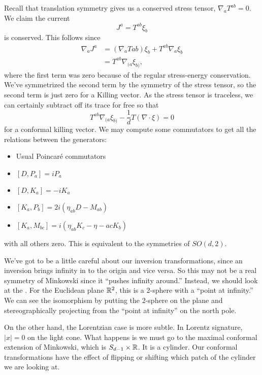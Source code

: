 Recall that translation symmetry gives us a conserved stress tensor, $\nabla_a T^{ab}=0$. We claim the current
\begin{equation}
    J^a = T^{ab} \xi_b
\end{equation}
is conserved. This follows since
\begin{align}
    \nabla_a J^a &= (\nabla_a T{ab})\xi_b + T^{ab} \nabla_a \xi_b\\
        &=T^{ab} \nabla_{(a}\xi_{b)},
\end{align}
where the first term was zero because of the regular stress-energy conservation. We've symmetrized the second term by the symmetry of the stress tensor, so the second term is just zero for a Killing vector. As the stress tensor is traceless, we can certainly subtract off its trace for free so that
\begin{equation}
    T^{ab}\nabla_{(a}\xi_{b)} - \frac{1}{d} T(\nabla \cdot \xi) = 0
\end{equation}
for a conformal killing vector. We may compute some commutators to get all the relations between the generators:
\begin{itemize}
    \item Usual Poincar\'e commutators
    \item $[D,P_a]=iP_a$
    \item $[D,K_a] = -iK_a$
    \item $[K_a,P_b] = 2i (\eta_{ab} D - M_{ab})$
    \item $[K_a,M_{bc}]=i(\eta_{ab} K_c - \eta-{ac} K_b)$
\end{itemize}
with all others zero. This is equivalent to the symmetries of $SO(d,2)$.

We've got to be a little careful about our inversion transformations, since an inversion brings infinity in to the origin and vice versa. So this may not be a real symmetry of Minkowski since it ``pushes infinity around.'' Instead, we should look at the . For the Euclidean plane $\mathbb{R}^2$, this is a 2-sphere with a ``point at infinity.'' We can see the isomorphism by putting the 2-sphere on the plane and stereographically projecting from the ``point at infinity'' on the north pole. 

On the other hand, the Lorentzian case is more subtle. In Lorentz signature, $|x|=0$ on the light cone. What happens is we must go to the maximal conformal extension of Minkowski, which is $S_{d-1}\times \mathbb{R}$. It is a cylinder. Our conformal transformations have the effect of flipping or shifting which patch of the cylinder we are looking at.

